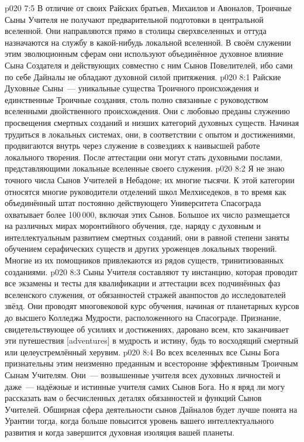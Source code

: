 \vs p020 7:5 В отличие от своих Райских братьев, Михаилов и Авоналов, Троичные Сыны Учителя не получают предварительной подготовки в центральной вселенной. Они направляются прямо в столицы сверхвселенных и оттуда назначаются на службу в какой\hyp{}нибудь локальной вселенной. В своём служении этим эволюционным сферам они используют объединённое духовное влияние Сына Создателя и действующих совместно с ним Сынов Повелителей, ибо сами по себе Дайналы не обладают духовной силой притяжения.
\vs p020 8:1 Райские Духовные Сыны~--- уникальные существа Троичного происхождения и единственные Троичные создания, столь полно связанные с руководством вселенными двойственного происхождения. Они с любовью преданы служению просвещения смертных созданий и низших категорий духовных существ. Начиная трудиться в локальных системах, они, в соответствии с опытом и достижениями, продвигаются внутрь через служение в созвездиях к наивысшей работе локального творения. После аттестации они могут стать духовными послами, представляющими локальные вселенные своего служения.
\vs p020 8:2 Я не знаю точного числа Сынов Учителей в Небадоне; их многие тысячи. К этой категории относятся многие руководители отделений школ Мелхиседеков, в то время как объединённый штат постоянно действующего Университета Спасограда охватывает более 100\,000, включая этих Сынов. Большое их число размещается на различных мирах моронтийного обучения, где, наряду с духовным и интеллектуальным развитием смертных созданий, они в равной степени заняты обучением серафических существ и других уроженцев локальных творений. Многие из их помощников привлекаются из рядов существ, тринитизованных созданиями.
\vs p020 8:3 Сыны Учителя составляют ту инстанцию, которая проводит все экзамены и тесты для квалификации и аттестации всех подчинённых фаз вселенского служения, от обязанностей стражей аванпостов до исследователей звёзд. Они проводят многовековой курс обучения, начиная от планетарных курсов до высшего Колледжа Мудрости, расположенного на Спасограде. Признание, свидетельствующее об усилиях и достижениях, даровано всем, кто заканчивает эти путешествия [adventures] в мудрость и истину, будь то восходящий смертный или целеустремлённый херувим.
\vs p020 8:4 Во всех вселенных все Сыны Бога признательны этим неизменно преданным и всесторонне эффективным Троичным Сынам Учителям. Они~--- возвышенные учителя всех духовных личностей и даже~--- надёжные и истинные учителя самих Сынов Бога. Но я вряд ли могу рассказать вам о бесчисленных деталях обязанностей и функций Сынов Учителей. Обширная сфера деятельности сынов Дайналов будет лучше понята на Урантии тогда, когда больше повысится уровень вашего интеллектуального развития и когда завершится духовная изоляция вашей планеты.
